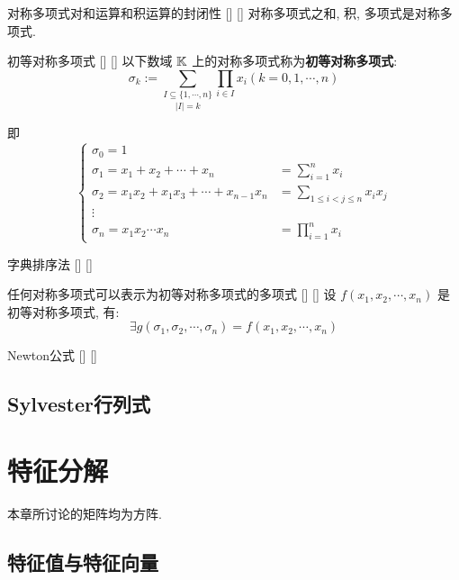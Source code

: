 \documentclass[UTF8]{ctexart}
\DeclareMathOperator{\0}{\mathbf{0}}
\DeclareMathOperator{\<}{\langle}
\renewcommand{\>}{\rangle}
\begin{document}
		\begin{ppt}
			[]
			{对称多项式对和运算和积运算的封闭性}
			[]
			[]
			对称多项式之和, 积, 多项式是对称多项式. 
		\end{ppt}
		
		\begin{dfn}
			[]
			{初等对称多项式}
			[]
			[]
			以下数域 \(\operatorname{\mathbb{K}}\) 上的对称多项式称为\textbf{初等对称多项式}: 
			\[\sigma_k:=\underset{|I|=k}{\sum_{I\subseteq\{1,\cdots,n\}}}\prod_{i\in I} x_i(k=0,1,\cdots,n)\]
			
			即
			\[\begin{cases}
				\sigma_0=1\\
				\sigma_1=x_1+x_2+\cdots+x_n & =\sum\limits_{i=1}^n x_i\\
				\sigma_2=x_1 x_2+x_1 x_3+\cdots+x_{n-1}x_n & =\sum\limits_{1\leq i<j\leq n}x_i x_j\\
				\vdots\\
				\sigma_n=x_1 x_2 \cdots x_n & =\prod\limits_{i=1}^n x_i
			\end{cases}\]
		\end{dfn}
		
		\begin{dfn}
			[]
			{字典排序法}
			[]
			[]
		\end{dfn}
		
		\begin{thm}
			[]
			{任何对称多项式可以表示为初等对称多项式的多项式}
			[]
			[]
			设 \(f(x_1,x_2,\cdots,x_n)\) 是初等对称多项式, 有: 
			\[\exists g(\sigma_1,\sigma_2,\cdots,\sigma_n)=f(x_1,x_2,\cdots,x_n)\]
		\end{thm}
		
		\begin{thm}
			[]
			{Newton公式}
			[]
			[]
		\end{thm}
	
	\subsection{Sylvester行列式}
	
\section{特征分解}

	本章所讨论的矩阵均为方阵. 

	\subsection{特征值与特征向量}
		
\end{document}
